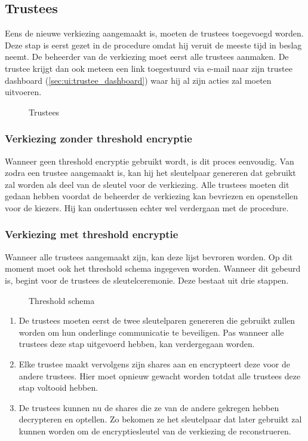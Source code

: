 \subsection{Trustees}
\label{sec:proc:trustees}

Eens de nieuwe verkiezing aangemaakt is, moeten de trustees toegevoegd worden. Deze stap is eerst gezet in de procedure omdat hij veruit de meeste tijd in beslag neemt. De beheerder van de verkiezing moet eerst alle trustees aanmaken. De trustee krijgt dan ook meteen een link toegestuurd via e-mail naar zijn trustee dashboard (\ref{sec:ui:trustee_dashboard}) waar hij al zijn acties zal moeten uitvoeren.

\begin{figure}
  \caption{Trustees}
  \label{fig:proc:trustees_view}
\end{figure}

\subsubsection{Verkiezing zonder threshold encryptie}

Wanneer geen threshold encryptie gebruikt wordt, is dit proces eenvoudig. Van zodra een trustee aangemaakt is, kan hij het sleutelpaar genereren dat gebruikt zal worden als deel van de sleutel voor de verkiezing. Alle trustees moeten dit gedaan hebben voordat de beheerder de verkiezing kan bevriezen en openstellen voor de kiezers. Hij kan ondertussen echter wel verdergaan met de procedure.

\subsubsection{Verkiezing met threshold encryptie}

\npar Wanneer alle trustees aangemaakt zijn, kan deze lijst bevroren worden. Op dit moment moet ook het threshold schema ingegeven worden. Wanneer dit gebeurd is, begint voor de trustees de sleutelceremonie. Deze bestaat uit drie stappen.

\begin{figure}
  \caption{Threshold schema}
  \label{fig:proc:trustees_freeze}
\end{figure}

\begin{enumerate}
  \item De trustees moeten eerst de twee sleutelparen genereren die gebruikt zullen worden om hun onderlinge communicatie te beveiligen. Pas wanneer alle trustees deze stap uitgevoerd hebben, kan verdergegaan worden.
  \item Elke trustee maakt vervolgens zijn shares aan en encrypteert deze voor de andere trustees. Hier moet opnieuw gewacht worden totdat alle trustees deze stap voltooid hebben.
  \item De trustees kunnen nu de shares die ze van de andere gekregen hebben decrypteren en optellen. Zo bekomen ze het sleutelpaar dat later gebruikt zal kunnen worden om de encryptiesleutel van de verkiezing de reconstrueren.
\end{enumerate}

